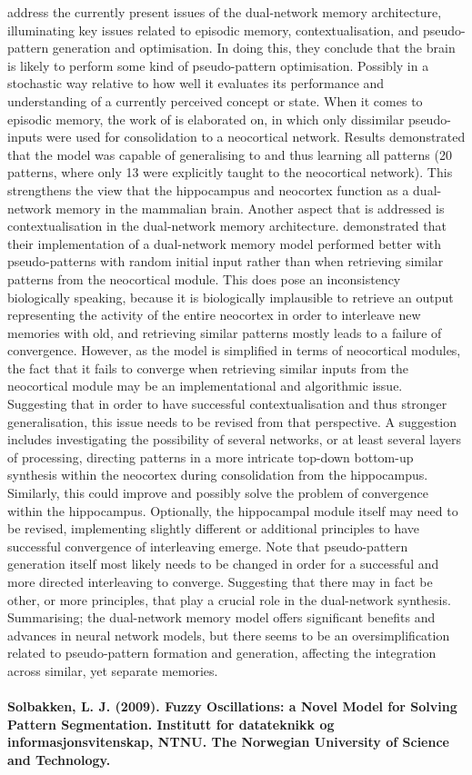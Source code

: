 \cite{French2001} address the currently present issues of the dual-network memory architecture, illuminating key issues related to episodic memory, contextualisation, and pseudo-pattern generation and optimisation. In doing this, they conclude that the brain is likely to perform some kind of pseudo-pattern optimisation. Possibly in a stochastic way relative to how well it evaluates its performance and understanding of a currently perceived concept or state. When it comes to episodic memory, the work of \cite{Ans2000} is elaborated on, in which only dissimilar pseudo-inputs were used for consolidation to a neocortical network. Results demonstrated that the model was capable of generalising to and thus learning all patterns (20 patterns, where only 13 were explicitly taught to the neocortical network). This strengthens the view that the hippocampus and neocortex function as a dual-network memory in the mammalian brain. Another aspect that is addressed is contextualisation in the dual-network memory architecture. \cite{Ans2000} demonstrated that their implementation of a dual-network memory model performed better with pseudo-patterns with random initial input rather than when retrieving similar patterns from the neocortical module. This does pose an inconsistency biologically speaking, because it is biologically implausible to retrieve an output representing the activity of the entire neocortex in order to interleave new memories with old, and retrieving similar patterns mostly leads to a failure of convergence. However, as the model is simplified in terms of neocortical modules, the fact that it fails to converge when retrieving similar inputs from the neocortical module may be an implementational and algorithmic issue. Suggesting that in order to have successful contextualisation and thus stronger generalisation, this issue needs to be revised from that perspective. A suggestion includes investigating the possibility of several networks, or at least several layers of processing, directing patterns in a more intricate top-down bottom-up synthesis within the neocortex during consolidation from the hippocampus. Similarly, this could improve and possibly solve the problem of convergence within the hippocampus. Optionally, the hippocampal module itself may need to be revised, implementing slightly different or additional principles to have successful convergence of interleaving emerge. Note that pseudo-pattern generation itself most likely needs to be changed in order for a successful and more directed interleaving to converge. Suggesting that there may in fact be other, or more principles, that play a crucial role in the dual-network synthesis. Summarising; the dual-network memory model offers significant benefits and advances in neural network models, but there seems to be an oversimplification related to pseudo-pattern formation and generation, affecting the integration across similar, yet separate memories.
\\
\\
\textbf{Solbakken, L. J. (2009). Fuzzy Oscillations: a Novel Model for Solving Pattern Segmentation. Institutt for datateknikk og informasjonsvitenskap, NTNU. The Norwegian University of Science and Technology.}

